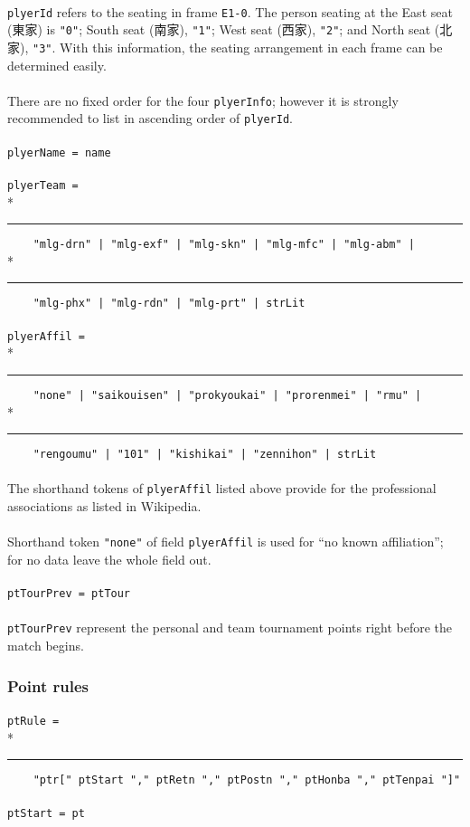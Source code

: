 \documentclass[%
	a4paper%
	,10pt%
	,twoside%
	,notitlepage%
]{article}%
\newcommand*{\ruleSymbol}{\textjapanese{⚠}}%
\newcommand*{\ruleMargin}{\marginpar{\flushright{}\ruleSymbol{}}}%
\newcommand*{\rulePar}{\paragraph*{\ruleMargin{}}}%
\newcommand*{\indentRule}{\rule{10pt}{0pt}}%
\begin{document}
			\paragraph*{}\lstinline/plyerId/ refers to the seating in frame \texttt{E1-0}. The person seating at the East seat (\textjapanese{東家}) is \lstinline/"0"/; South seat (\textjapanese{南家}), \lstinline/"1"/; West seat (\textjapanese{西家}), \lstinline/"2"/; and North seat (\textjapanese{北家}), \lstinline/"3"/. With this information, the seating arrangement in each frame can be determined easily. %
			\rulePar{}There are no fixed order for the four \lstinline/plyerInfo/; however it is strongly recommended to list in ascending order of \lstinline/plyerId/. %
			\rulePar{}\lstinline/plyerName = name/%
			\rulePar{}\lstinline/plyerTeam = /\\*{}%
			\indentRule{}\lstinline/    "mlg-drn" | "mlg-exf" | "mlg-skn" | "mlg-mfc" | "mlg-abm" | /\\*{}%
			\indentRule{}\lstinline/    "mlg-phx" | "mlg-rdn" | "mlg-prt" | strLit/%
			\rulePar{}\lstinline/plyerAffil = /\\*{}%
			\indentRule{}\lstinline/    "none" | "saikouisen" | "prokyoukai" | "prorenmei" | "rmu" | /\\*{}%
			\indentRule{}\lstinline/    "rengoumu" | "101" | "kishikai" | "zennihon" | strLit/%
			\paragraph*{}The shorthand tokens of \lstinline/plyerAffil/ listed above provide for the professional associations as listed in Wikipedia\cite{wiki-proassn}. %
			\rulePar{}Shorthand token \lstinline/"none"/ of field \lstinline/plyerAffil/ is used for ``no known affiliation''; for no data leave the whole field out. %
			\rulePar{}\lstinline/ptTourPrev = ptTour/%
			\paragraph*{}\lstinline/ptTourPrev/ represent the personal and team tournament points right before the match begins. %
		\subsubsection{Point rules}%
			\rulePar{}\lstinline/ptRule = /\\*{}%
			\indentRule{}\lstinline/    "ptr[" ptStart "," ptRetn "," ptPostn "," ptHonba "," ptTenpai "]"/%
			\rulePar{}\lstinline/ptStart = pt/%
\end{document}
